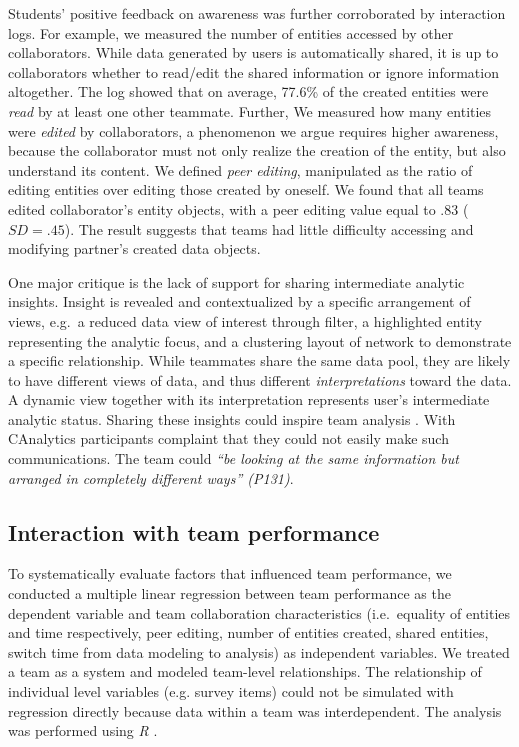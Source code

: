 Students' positive feedback on awareness was further corroborated by
interaction logs. For example, we measured the number of entities
accessed by other collaborators. While data
generated by users is automatically shared, it is up to collaborators
whether to read/edit the shared information or ignore information altogether.
The log showed that on average, 77.6\% of the created entities
were \emph{read} by at least one other teammate. Further, We measured how
many entities were \emph{edited} by collaborators, a phenomenon we argue
requires higher awareness, because the collaborator must not only realize
the creation of the entity, but also understand its content. We
defined \emph{peer editing}, manipulated as the ratio of editing 
entities over editing those created by oneself. We found that all teams
edited collaborator's entity objects, with a peer editing value equal
to .83 ($SD=.45$). The result suggests that teams had little difficulty
accessing and modifying partner's created data objects.

One major critique is the lack of support for sharing intermediate analytic
insights. Insight is revealed and contextualized by a specific arrangement of views, e.g.~a reduced data view of interest through filter, a highlighted entity representing the analytic focus, and a clustering layout of network to demonstrate a specific relationship. While teammates share the same data pool, they are likely to have different views of data, and thus different \emph{interpretations}
toward the data. A dynamic view together with its interpretation represents
user's intermediate analytic status. Sharing these insights could inspire team analysis \citep{Gotz2009d}. With CAnalytics
participants complaint that they could not easily make such communications. The team could \emph{``be
looking at the same information but arranged in completely different
ways'' (P131)}.

\subsection{Interaction with team performance}

To systematically evaluate factors that influenced team performance,
we conducted a multiple linear regression between team performance
as the dependent variable and team collaboration characteristics
(i.e.~equality of entities and time respectively, peer editing, number of entities created, shared
entities, switch time from data modeling to analysis) as independent
variables. We treated a team as a system \citep{Henman2003b} and modeled team-level
relationships.
The relationship of individual level variables (e.g.
survey items) could not be simulated with regression directly because data within a team was interdependent. The analysis was performed using \emph{R} \citep{R2016}.

